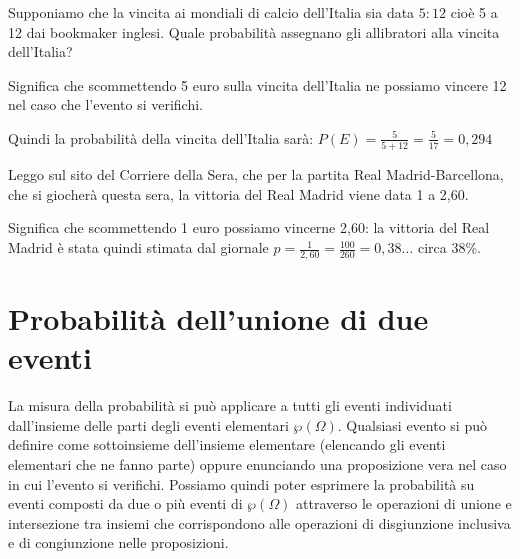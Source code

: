\begin{esempio}
Supponiamo che la vincita ai mondiali di calcio dell'Italia sia data \(5:12\) 
cioè 
5 a 12 dai bookmaker inglesi. Quale probabilità assegnano gli allibratori 
alla 
vincita dell'Italia?

Significa che scommettendo 5 euro sulla vincita dell'Italia ne possiamo 
vincere 
12 nel caso che l'evento si verifichi.

Quindi la probabilità della vincita dell'Italia sarà:
\(P(E)=\frac 5{5+12}=\frac 5{17}=0,294\)
\end{esempio}

\begin{esempio}
Leggo sul sito del Corriere della Sera, che per la partita Real 
Madrid-Barcellona, che si giocherà questa sera, la vittoria del Real Madrid 
viene data 1 a 2,60.

Significa che scommettendo 1 euro possiamo vincerne 2,60: la vittoria del 
Real 
Madrid è stata quindi stimata dal giornale \(p=\frac 
1{2,60}=\frac{100}{260}=0,38\ldots\) circa 38\%.
\end{esempio}


\section{Probabilità dell'unione di due eventi}
\label{sec:09_unione}

La misura della probabilità si può applicare a tutti gli eventi individuati 
dall'insieme delle parti degli eventi elementari \(\wp (\Omega )\). Qualsiasi 
evento si può definire come sottoinsieme dell'insieme elementare (elencando 
gli 
eventi elementari che ne fanno parte) oppure enunciando una proposizione 
vera 
nel caso in cui l'evento si verifichi. Possiamo quindi poter esprimere la 
probabilità su eventi composti da due o più eventi di \(\wp (\Omega )\) 
attraverso 
le operazioni di unione e intersezione tra insiemi che corrispondono alle 
operazioni di disgiunzione inclusiva e di congiunzione nelle proposizioni.

